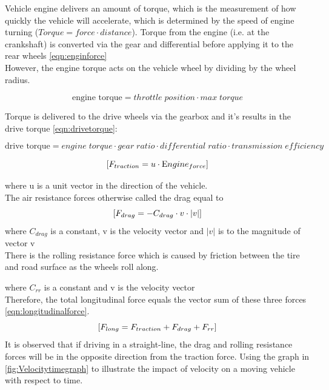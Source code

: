 \documentclass{book}
\begin{document}
Vehicle engine delivers an amount of torque, which  is the measurement of how quickly the vehicle will accelerate, which is determined by the speed of engine turning ($Torque = force \cdot distance$). Torque from the engine (i.e. at the crankshaft) is converted via the gear and differential before applying it to the rear wheels \ref{eqn:enginforce}\\
However, the engine torque acts on the vehicle wheel by dividing by the wheel radius.

\begin{equation}
 \mbox{engine torque} = throttle \; position \cdot max \; torque
 \label{eqn:enginforce}
\end{equation}

Torque is delivered to the drive wheels via the gearbox and it's results in the drive torque \ref{eqn:drivetorque}:

\begin{equation}
 \mbox{drive torque}  = engine \;torque \cdot gear \; ratio \cdot differential \; ratio \cdot transmission \; efficiency \
 \label{eqn:drivetorque}
\end{equation}

   \begin{equation}
    \mbox[{F_{traction}}  = {u \cdot \mbox Engine_{force}} ] %
    \label{eqn:tractionforce} %
   \end{equation}

   where u is a unit vector in the direction of the vehicle.\\

   The air resistance forces otherwise called the  drag equal to
   \begin{equation}
   \mbox[{F_{drag}} =  - C_{drag} \cdot v \cdot |v| ]
   \label {eqn:airresistance}
   \end{equation}%
   where $C_{drag}$ is a constant, v is the velocity vector and $|v|$ is to the magnitude of vector v\\
There is the rolling resistance force which is caused by friction between the tire and road surface as the wheels roll along.

\begin{equation}
[F_{rr} = - C_{rr}  \dot v]
\label{rollingresistance}
\end{equation}
where $C_{rr}$ is a constant and v is the velocity vector\\

Therefore, the total longitudinal force equals the vector sum of these three forces \ref{eqn:longitudinalforce}.\\
\begin{equation}
\mbox [ {F_{long}} =   F_{traction} + F_{drag}  +  F_{rr}]
\label{eqn:longitudinalforce}
\end{equation}
It is observed that if driving in a straight-line, the drag and rolling resistance forces will be in the opposite direction from the traction force. Using the graph in \ref{fig:Velocitytimegraph} to illustrate the impact of velocity on a moving vehicle with respect to time.
\end{document}
